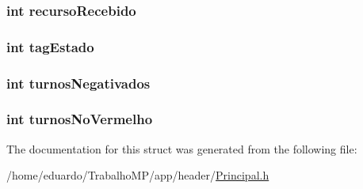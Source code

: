 \hypertarget{structcidade_a34541bd6c7eec1f2049716b02efe9572}{
\subsubsection[{recurso\-Recebido}]{\setlength{\rightskip}{0pt plus 5cm}int recurso\-Recebido}}\label{structcidade_a34541bd6c7eec1f2049716b02efe9572}
\hypertarget{structcidade_a8d061419bb8ae9b9fa16677008e41883}{
\subsubsection[{tag\-Estado}]{\setlength{\rightskip}{0pt plus 5cm}int tag\-Estado}}\label{structcidade_a8d061419bb8ae9b9fa16677008e41883}
\hypertarget{structcidade_a04ccadacb6fd2e1b9ce7469caee09cdd}{
\subsubsection[{turnos\-Negativados}]{\setlength{\rightskip}{0pt plus 5cm}int turnos\-Negativados}}\label{structcidade_a04ccadacb6fd2e1b9ce7469caee09cdd}
\hypertarget{structcidade_a15629cd2f5e328c1abbb6ee4b09b0af1}{
\subsubsection[{turnos\-No\-Vermelho}]{\setlength{\rightskip}{0pt plus 5cm}int turnos\-No\-Vermelho}}\label{structcidade_a15629cd2f5e328c1abbb6ee4b09b0af1}


The documentation for this struct was generated from the following file\-:\begin{DoxyCompactItemize}
\item 
/home/eduardo/\-Trabalho\-M\-P/app/header/\hyperlink{_principal_8h}{Principal.\-h}\end{DoxyCompactItemize}
